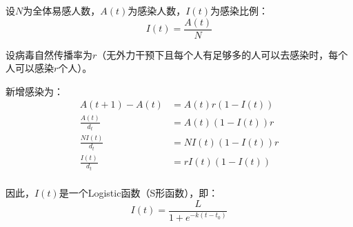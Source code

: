 \documentclass{ctexart}
\begin{document}
设$N$为全体易感人数，$A(t)$为感染人数，$I(t)$为感染比例：
\[
I(t) = \frac{A(t)}{N}
\]

设病毒自然传播率为$r$（无外力干预下且每个人有足够多的人可以去感染时，每个人可以感染$r$个人）。

新增感染为：
\begin{align*}
A(t+1) - A(t) &= A(t) r (1 - I(t)) \\
\frac{A(t)}{d_t} &= A(t)(1 - I(t)) r \\
\frac{N I(t)}{d_t} &= N I(t)(1 - I(t)) r \\
\frac{I(t)}{d_t} &= r I(t)(1 - I(t)) \\
\end{align*}

因此，$I(t)$是一个Logistic函数（S形函数），即：
\[
I(t) = \frac{L}{1 + e^{-k(t - t_0)}}
\]
\end{document}
